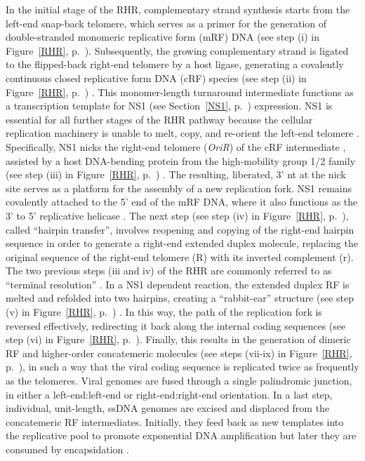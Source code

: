 In the initial stage of the RHR, complementary strand synthesis starts from the left-end snap-back telomere, which serves as a primer for the generation of double-stranded monomeric replicative form (mRF) DNA (see step (i) in Figure~\ref{RHR}, p.~\pageref{RHR}). Subsequently, the growing complementary strand is ligated to the flipped-back right-end telomere by a host ligase, generating a covalently continuous closed replicative form DNA (cRF) species (see step (ii) in Figure~\ref{RHR}, p.~\pageref{RHR}) \cite{pmid2911112, pmid2543770}. This monomer-length turnaround intermediate functions as a transcription template for NS1 (see Section~\ref{NS1}, p.~\pageref{NS1}) expression. NS1 is essential for all further stages of the RHR pathway because the cellular replication machinery is unable to melt, copy, and re-orient the left-end telomere \cite{pmid8995615}. Specifically, NS1 nicks the right-end telomere (\textit{OriR}) of the cRF intermediate \cite{pmid9349487}, assisted by a host DNA-bending protein from the high-mobility group 1/2 family (see step (iii) in Figure~\ref{RHR}, p.~\pageref{RHR}) \cite{pmid9765384}. The resulting, liberated, 3' nt at the nick site serves as a platform for the assembly of a new replication fork. NS1 remains covalently attached to the 5' end of the mRF DNA, where it also functions as the 3' to 5' replicative helicase \cite{pmid12050365, pmid3339715, pmid3203742}. The next step (see step (iv) in Figure~\ref{RHR}, p.~\pageref{RHR}), called ``hairpin transfer'', involves reopening and copying of the right-end hairpin sequence in order to generate a right-end extended duplex molecule, replacing the original sequence of the right-end telomere (R) with its inverted complement (r). The two previous steps (iii and iv) of the RHR are commonly referred to as ``terminal resolution'' \cite{telomere2}. In a NS1 dependent reaction, the extended duplex RF is melted and refolded into two hairpins, creating a ``rabbit-ear'' structure (see step (v) in Figure~\ref{RHR}, p.~\pageref{RHR}) \cite{pmid14997524, pmid12075084}. In this way, the path of the replication fork is reversed effectively, redirecting it back along the internal coding sequences (see step (vi) in Figure~\ref{RHR}, p.~\pageref{RHR}). Finally, this results in the generation of dimeric RF and higher-order concatemeric molecules (see steps (vii-ix) in Figure~\ref{RHR}, p.~\pageref{RHR}), in such a way that the viral coding sequence is replicated twice as frequently as the telomeres. Viral genomes are fused through a single palindromic junction, in either a left-end:left-end or right-end:right-end orientation. In a last step, individual, unit-length, ssDNA genomes are excised and displaced from the concatemeric RF intermediates. Initially, they feed back as new templates into the replicative pool to promote exponential DNA amplification but later they are consumed by encapsidation \cite{pmid15681430, encapsidation}.           


